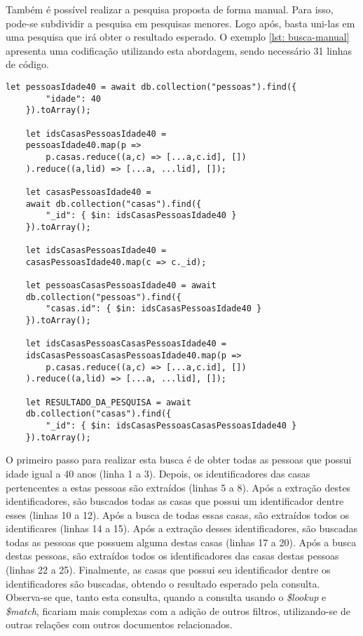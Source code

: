 Também é possível realizar a pesquisa proposta de forma manual. Para isso, pode-se subdividir a pesquisa em pesquisas menores. Logo após, basta uni-las em uma pesquisa que irá obter o resultado esperado. O exemplo \ref{lst: busca-manual} apresenta uma codificação utilizando esta abordagem, sendo necessário 31 linhas de código.



\begin{lstlisting}[style=ES6, caption={Busca em Dados Normalizados de Forma Manual\label{lst: busca-manual}}]
    let pessoasIdade40 = await db.collection("pessoas").find({
        "idade": 40
    }).toArray();
    
    let idsCasasPessoasIdade40 = 
    pessoasIdade40.map(p => 
        p.casas.reduce((a,c) => [...a,c.id], [])
    ).reduce((a,lid) => [...a, ...lid], []);
    
    let casasPessoasIdade40 =
    await db.collection("casas").find({
        "_id": { $in: idsCasasPessoasIdade40 }
    }).toArray();
    
    let idsCasasPessoasIdade40 = 
    casasPessoasIdade40.map(c => c._id);
    
    let pessoasCasasPessoasIdade40 = await
    db.collection("pessoas").find({
        "casas.id": { $in: idsCasasPessoasIdade40 }
    }).toArray();
    
    let idsCasasPessoasCasasPessoasIdade40 = 
    idsCasasPessoasCasasPessoasIdade40.map(p => 
        p.casas.reduce((a,c) => [...a,c.id], [])
    ).reduce((a,lid) => [...a, ...lid], []);
    
    let RESULTADO_DA_PESQUISA = await
    db.collection("casas").find({
        "_id": { $in: idsCasasPessoasCasasPessoasIdade40 }
    }).toArray();
\end{lstlisting}
    
O primeiro passo para realizar esta busca é de obter todas as pessoas que possui idade igual a 40 anos (linha 1 a 3). Depois, os identificadores das casas pertencentes a estas pessoas são extraídos (linhas 5 a 8). Após a extração destes identificadores, são buscados todas as casas que possui um identificador dentre esses (linhas 10 a 12). Após a busca de todas essas casas, são extraídos todos os identificares (linhas 14 a 15). Após a extração desses identificadores, são buscadas todas as pessoas que possuem alguma destas casas (linhas 17 a 20). Após a busca destas pessoas, são extraídos todos os identificadores das casas destas pessoas (linhas 22 a 25). Finalmente, as casas que possui seu identificador dentre os identificadores são buscadas, obtendo o resultado esperado pela consulta. Observa-se que, tanto esta consulta, quando a consulta usando o \textit{\$lookup} e \textit{\$match}, ficariam mais complexas com a adição de outros filtros, utilizando-se de outras relações com outros documentos relacionados.

